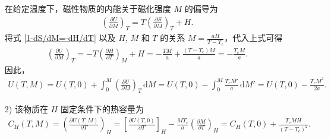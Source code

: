 \documentclass{assignment}
\begin{document}
\begin{sol}
\begin{itemize}
        在给定温度下，磁性物质的内能关于磁化强度 $M$ 的偏导为
        \begin{align}
            \left(\frac{\partial U}{\partial M}\right)_T=T\left(\frac{\partial S}{\partial M}\right)_T+H.
        \end{align}
        将式 \eqref{1-dS/dM=-dH/dT} 以及 $H$, $M$ 和 $T$ 的关系 $M=\frac{aH}{T-T_c}$，代入上式可得
        \begin{align}
            \label{1-dU/dM}
            \left(\frac{\partial U}{\partial M}\right)_T=-T\left(\frac{\partial H}{\partial T}\right)_M+H=-\frac{TM}{a}+\frac{(T-T_c)M}{a}=-\frac{T_cM}{a}.
        \end{align}
        因此，
        \begin{align}
            U(T,M)=U(T,0)+\int_0^M\left(\frac{\partial U}{\partial M}\right)_T\,\mathrm{d}M=U(T,0)-\int_0^M\frac{T_cM'}{a}\,\mathrm{d}M'=U(T,0)-\frac{T_cM^2}{2a}.
        \end{align}
        \item[2)] 该物质在 $H$ 固定条件下的热容量为
        \begin{align}
            C_H(T,M)=\left(\frac{\partial U(T,M)}{\partial T}\right)_H=\left[\frac{\partial U(T,0)}{\partial T}\right]_H-\frac{MT_c}{a}\left(\frac{\partial M}{\partial T}\right)_H=C_H(T,0)+\frac{T_cMH}{(T-T_c)^2}.
        \end{align}

\end{itemize}
\end{sol}
\end{document}

